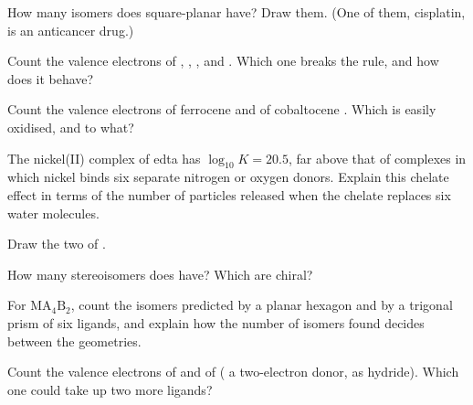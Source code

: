 \begin{exercise}[$\star\star$]\label{exo:b2:coordination-complexes:5}
How many isomers does square-planar \ce{[PtCl2(NH3)2]} have? Draw them. (One of them,
cisplatin, is an anticancer drug.)
\end{exercise}

\begin{exercise}[$\star\star$]\label{exo:b2:coordination-complexes:6}
Count the valence electrons of , , ,
 and . Which one breaks the rule, and how does it behave?
\end{exercise}

\begin{exercise}[$\star\star$]\label{exo:b2:coordination-complexes:7}
Count the valence electrons of ferrocene and of cobaltocene . Which is
easily oxidised, and to what?
\end{exercise}

\begin{exercise}[$\star\star$]\label{exo:b2:coordination-complexes:8}
The nickel(II) complex of edta has $\log_{10}K = 20.5$, far above that of complexes in
which nickel binds six separate nitrogen or oxygen donors. Explain this chelate effect
in terms of the number of particles released when the chelate replaces six water
molecules.
\end{exercise}

\begin{exercise}[$\star\star$]\label{exo:b2:coordination-complexes:9}
Draw the two  of .
\end{exercise}

\begin{exercise}[$\star\star\star$]\label{exo:b2:coordination-complexes:10}
How many stereoisomers does \ce{[CoCl2(en)2]+} have? Which are chiral?
\end{exercise}

\begin{exercise}[$\star\star\star$]\label{exo:b2:coordination-complexes:11}
For $\mathrm{MA_4B_2}$, count the isomers predicted by a planar hexagon and by a trigonal
prism of six ligands, and explain how the number of isomers found decides between the
geometries.
\end{exercise}

\begin{exercise}[$\star\star\star$]\label{exo:b2:coordination-complexes:12}
Count the valence electrons of  and of 
( a two-electron donor,  as hydride). Which one could take up two more
ligands?
\end{exercise}

